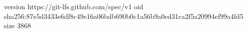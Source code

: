 version https://git-lfs.github.com/spec/v1
oid sha256:87e5d3433e6df8c49e16a06bdb690b0c1a56b9a0ed31ca2f5a20994ef99a4fd5
size 3868

